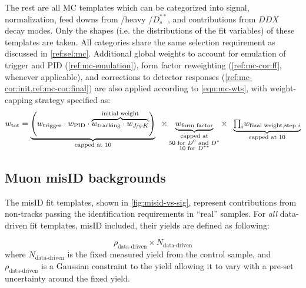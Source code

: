 The rest are all MC templates which can be categorized into signal,
normalization, feed downs from \Dstst/heavy \Dstst/$D^{**}_s$, and contributions
from $DDX$ decay modes.
Only the shapes (i.e. the distributions of the fit variables) of these templates
are taken.
All categories share the same selection requirement as discussed in
\cref{ref:sel:mc}.
Additional global weights to account for emulation of trigger and PID
(\cref{ref:mc-emulation}),
form factor reweighting (\cref{ref:mc-cor:ff}, whenever applicable),
and corrections to detector responses (\cref{ref:mc-cor:init,ref:mc-cor:final})
are also applied according to \cref{eqn:mc-wts},
with weight-capping strategy specified as:
\begin{equation}
    w_\text{tot} = \underbrace{\left(
            w_\text{trigger} \cdot w_\text{PID} \cdot
            \overbrace{
                w_\text{tracking} \cdot w_{\jpsi\kaon}
            }^\text{initial weight}
        \right)}_\text{capped at 10} \;\; \times
        \underbrace{w_\text{form factor}}_{\substack{
            \text{capped at} \\
            \text{50 for \Dz and \Dstar} \\
            \text{10 for $D^{**}$}
        }} \times \;\;
        \underbrace{
            {\textstyle\prod_i} w_\text{final weight,step $i$}
        }_\text{capped at 10}
        \label{eqn:mc-wts}
\end{equation}






\subsection{Muon misID backgrounds}
\label{ref:fit:tmpl:misid}

The \muon misID fit templates,
shown in \cref{fig:misid-vs-sig},
represent contributions from non-\muon tracks passing the \muon
identification requirements in ``real'' \muon samples.
For \emph{all} data-driven fit templates, misID included,
their yields are defined as following:

\begin{equation}
    \rho_\text{data-driven} \times N_\text{data-driven}
\end{equation}
where $N_\text{data-driven}$ is the fixed measured yield from the control sample,
and $\rho_\text{data-driven}$ is a Gaussian constraint to the yield
allowing it to vary with a pre-set uncertainty around the fixed yield.

